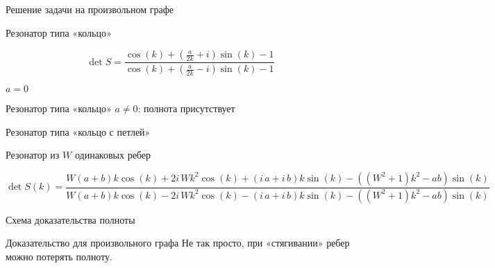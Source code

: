 \documentclass{beamer}
\begin{document}
\begin{frame}{Решение задачи на произвольном графе}

\end{frame}

\begin{frame}{Резонатор типа «кольцо»}

\[
\det S = 
\frac
{\cos\left(k\right) + {\left(\frac{a}{2 k} + i\right)} \sin\left(k\right) - 1}
{\cos\left(k\right) + {\left(\frac{a}{2 k} - i\right)} \sin\left(k\right) - 1}
\]

$a = 0$



\end{frame}

\begin{frame}{Резонатор типа «кольцо»}
$a \ne 0$: полнота присутствует


\end{frame}

\begin{frame}{Резонатор типа «кольцо с петлей»}


\end{frame}


\begin{frame}{Резонатор из $W$ одинаковых ребер}


{
\scriptsize
\[
\det S(k) = \frac{W {\left(a + b\right)} k \cos\left(k\right) + 2 i \, W k^{2} \cos\left(k\right) + {\left(i \, a + i \, b\right)} k \sin\left(k\right) - {\left({\left(W^{2} + 1\right)} k^{2} - a b\right)} \sin\left(k\right)}{W {\left(a + b\right)} k \cos\left(k\right) - 2 i \, W k^{2} \cos\left(k\right) - {\left(i \, a + i \, b\right)} k \sin\left(k\right) - {\left({\left(W^{2} + 1\right)} k^{2} - a b\right)} \sin\left(k\right)}
\]
}

\end{frame}

\begin{frame}{Схема доказательства полноты}
\end{frame}

\begin{frame}{Доказательство для произвольного графа}
Не так просто, при «стягивании» ребер можно потерять полноту. 
\end{frame}
\end{document}
